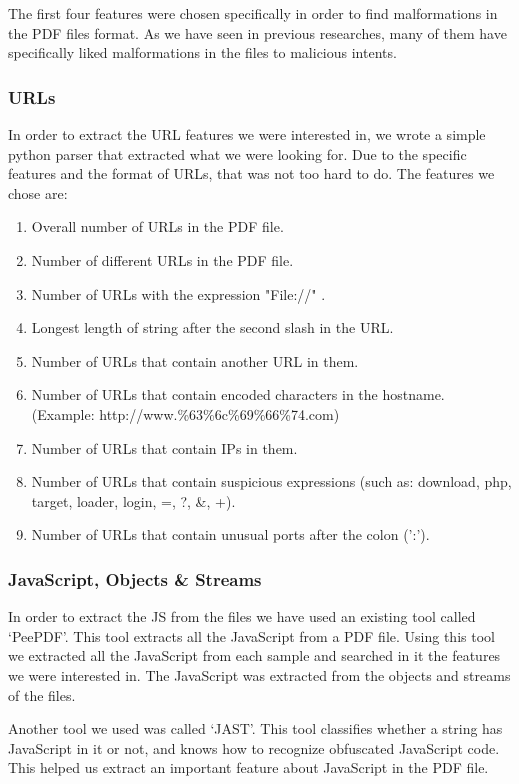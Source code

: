 \documentclass{article}
\begin{document}
\indent The first four features were chosen specifically in order to find malformations in the PDF files format. As we have seen in previous researches, many of them have specifically liked malformations in the files to malicious intents.

\subsubsection{URLs}
\indent	In order to extract the URL features we were interested in, we wrote a simple python parser that extracted what we were looking for. Due to the specific features and the format of URLs, that was not too hard to do. The features we chose are:

\begin{enumerate}
	\item Overall number of URLs in the PDF file.
	\item Number of different URLs in the PDF file.
	\item Number of URLs with the expression "File://" .
	\item Longest length of string after the second slash in the URL.
	\item Number of URLs that contain another URL in them.
	\item Number of URLs that contain encoded characters in the hostname. (Example: http://www.\%63\%6c\%69\%66\%74.com)
	\item Number of URLs that contain IPs in them.
	\item Number of URLs that contain suspicious expressions (such as: download, php, target, loader, login, =, ?, \&, +).
	\item Number of URLs that contain unusual ports after the colon (':').
\end{enumerate}

\subsubsection{JavaScript, Objects \& Streams}
\indent	In order to extract the JS from the files we have used an existing tool called ‘PeePDF’. This tool extracts all the JavaScript from a PDF file. Using this tool we extracted all the JavaScript from each sample and searched in it the features we were interested in. The JavaScript was extracted from the objects and streams of the files. 

\indent	Another tool we used was called ‘JAST’. This tool classifies whether a string has JavaScript in it or not, and knows how to recognize obfuscated JavaScript code. This helped us extract an important feature about JavaScript in the PDF file.
\end{document}
